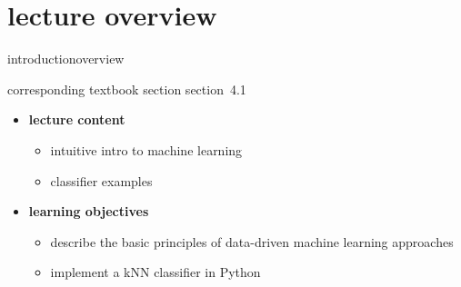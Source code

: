 


\subtitle{module 4.1: classification}


	

    \section[overview]{lecture overview}
        \begin{frame}{introduction}{overview}
            \begin{block}{corresponding textbook section}
                    section~4.1
            \end{block}

            \begin{itemize}
                \item   \textbf{lecture content}
                    \begin{itemize}
                        \item   intuitive intro to machine learning
                        \item   classifier examples
                    \end{itemize}
                \bigskip
                \item<2->   \textbf{learning objectives}
                    \begin{itemize}
                        \item   describe the basic principles of data-driven machine learning approaches
                        \item   implement a kNN classifier in Python
                    \end{itemize}
            \end{itemize}
        \end{frame}


